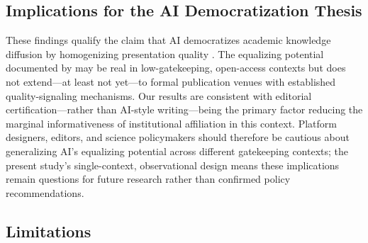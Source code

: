 \documentclass[12pt,a4paper]{article}
\begin{document}
\subsection{Implications for the AI Democratization Thesis}

These findings qualify the claim that AI democratizes academic
knowledge diffusion by homogenizing presentation quality
\citep{Liang2024}.
The equalizing potential documented by \citet{JoLi2026} may be
real in low-gatekeeping, open-access contexts but does not extend---at
least not yet---to formal publication venues with established
quality-signaling mechanisms.
Our results are consistent with editorial certification---rather than
AI-style writing---being the primary factor reducing the marginal
informativeness of institutional affiliation in this context.
Platform designers, editors, and science policymakers should therefore
be cautious about generalizing AI's equalizing potential across
different gatekeeping contexts; the present study's single-context,
observational design means these implications remain questions for
future research rather than confirmed policy recommendations.

\subsection{Limitations}
\end{document}
